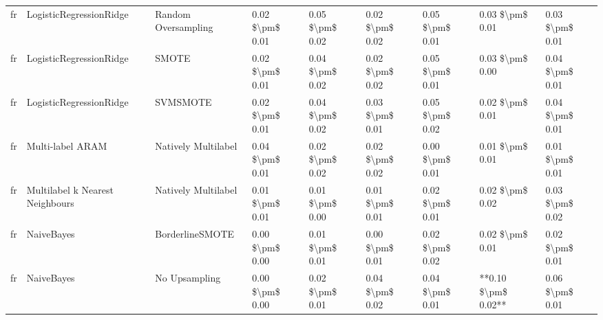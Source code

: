 \begin{tabular}{lllllllll}
      fr &         LogisticRegressionRidge &           Random Oversampling & 0.02 \$\textbackslash pm\$ 0.01 &           0.05 \$\textbackslash pm\$ 0.02 &       0.02 \$\textbackslash pm\$ 0.02 &        0.05 \$\textbackslash pm\$ 0.01 &                         0.03 \$\textbackslash pm\$ 0.01 &     0.03 \$\textbackslash pm\$ 0.01 \\
      fr &         LogisticRegressionRidge &                         SMOTE & 0.02 \$\textbackslash pm\$ 0.01 &           0.04 \$\textbackslash pm\$ 0.02 &       0.02 \$\textbackslash pm\$ 0.02 &        0.05 \$\textbackslash pm\$ 0.01 &                         0.03 \$\textbackslash pm\$ 0.00 &     0.04 \$\textbackslash pm\$ 0.01 \\
      fr &         LogisticRegressionRidge &                      SVMSMOTE & 0.02 \$\textbackslash pm\$ 0.01 &           0.04 \$\textbackslash pm\$ 0.02 &       0.03 \$\textbackslash pm\$ 0.01 &        0.05 \$\textbackslash pm\$ 0.02 &                         0.02 \$\textbackslash pm\$ 0.01 &     0.04 \$\textbackslash pm\$ 0.01 \\
      fr &                Multi-label ARAM &           Natively Multilabel & 0.04 \$\textbackslash pm\$ 0.01 &           0.02 \$\textbackslash pm\$ 0.02 &       0.02 \$\textbackslash pm\$ 0.02 &        0.00 \$\textbackslash pm\$ 0.01 &                         0.01 \$\textbackslash pm\$ 0.01 &     0.01 \$\textbackslash pm\$ 0.01 \\
      fr & Multilabel k Nearest Neighbours &           Natively Multilabel & 0.01 \$\textbackslash pm\$ 0.01 &           0.01 \$\textbackslash pm\$ 0.00 &       0.01 \$\textbackslash pm\$ 0.01 &        0.02 \$\textbackslash pm\$ 0.01 &                         0.02 \$\textbackslash pm\$ 0.02 &     0.03 \$\textbackslash pm\$ 0.02 \\
      fr &                      NaiveBayes &               BorderlineSMOTE & 0.00 \$\textbackslash pm\$ 0.00 &           0.01 \$\textbackslash pm\$ 0.01 &       0.00 \$\textbackslash pm\$ 0.01 &        0.02 \$\textbackslash pm\$ 0.02 &                         0.02 \$\textbackslash pm\$ 0.01 &     0.02 \$\textbackslash pm\$ 0.01 \\
      fr &                      NaiveBayes &                 No Upsampling & 0.00 \$\textbackslash pm\$ 0.00 &           0.02 \$\textbackslash pm\$ 0.01 &       0.04 \$\textbackslash pm\$ 0.02 &        0.04 \$\textbackslash pm\$ 0.01 &                     **0.10 \$\textbackslash pm\$ 0.02** &     0.06 \$\textbackslash pm\$ 0.01 \\

\end{tabular}
